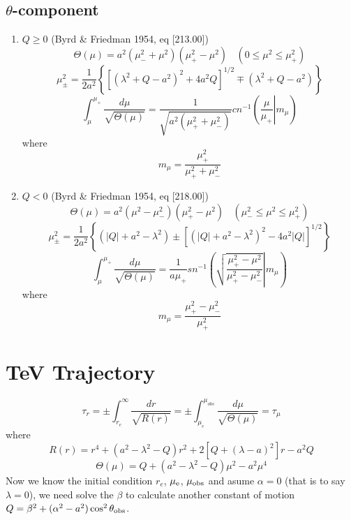 \documentclass[12pt]{book}
\begin{document}
\subsection{$\theta$-component}
\begin{enumerate}
 \item  $Q\geq0$ (Byrd \& Friedman 1954, eq [213.00])
%
\begin{equation}
\Theta(\mu)=a^2(\mu_{-}^2+\mu^2)(\mu_{+}^2-\mu^2)~~~~( 0\leq \mu^2 \leq \mu_+^2)
\end{equation}
%
\begin{equation}
 \mu_{\pm}^2=\frac{1}{2a^2}\left\{\left[\left(\lambda^2+Q-a^2\right)^2+4a^2Q\right]^{1/2}
\mp \left(\lambda^2+Q-a^2\right)\right\}
\end{equation}
%
\begin{equation}
\int_{\mu}^{\mu_{+}}\frac{d\mu}{\sqrt{\Theta(\mu)}}
=\frac{1}{\sqrt{a^2(\mu_{+}^2+\mu_{-}^2)}}cn^{-1}\left(\left.\frac{\mu}{\mu_+}\right|m_\mu\right)
\end{equation}
%
where
\begin{equation}
 m_\mu=\frac{\mu_+^2}{\mu_+^2+\mu_-^2}
\end{equation}
%
\item $Q<0$ (Byrd \& Friedman 1954, eq [218.00])
%
\begin{equation}
\Theta(\mu)=a^2(\mu^2-\mu_{-}^2)(\mu_{+}^2-\mu^2)~~~~( \mu_-^2\leq \mu^2 \leq \mu_+^2)
\end{equation}
%
\begin{equation}
 \mu_{\pm}^2=\frac{1}{2a^2}\left\{\left(|Q|+a^2-\lambda^2\right)
\pm\left[\left(|Q|+a^2-\lambda^2\right)^2-4a^2|Q|\right]^{1/2}\right\}
\end{equation}
%
\begin{equation}
\int_{\mu}^{\mu_+}\frac{d\mu}{\sqrt{\Theta(\mu)}}
=\frac{1}{a\mu_+}sn^{-1}\left(\left.\sqrt{\frac{\mu_+^2-\mu^2}{\mu_+^2-\mu_-^2}}\right|m_\mu\right)
\end{equation}
where
\begin{equation}
 m_\mu=\frac{\mu_+^2-\mu_-^2}{\mu_+^2}
\end{equation}
\end{enumerate}
\section{TeV Trajectory}
\begin{equation}
\tau_r=\pm\int_{r_e}^{\infty}\frac{dr}{\sqrt{R(r)}}=\pm\int_{\mu_e}^{\mu_{obs}}\frac{d\mu}{\sqrt{\Theta(\mu)}}
=\tau_\mu
\end{equation}
where
\begin{equation}
R(r)=r^4+(a^2-\lambda^2-Q)r^2+2[Q+(\lambda-a)^2]r-a^2Q
\end{equation}
\begin{equation}
\Theta(\mu)=Q+(a^2-\lambda^2-Q)\mu^2-a^2\mu^4
\end{equation}
Now we know the initial condition $r_e$, $\mu_{\rm e}$, $\mu_{\rm obs}$ and asume $\alpha=0$ (that is to say $\lambda=0$), we need solve the $\beta$ to calculate another constant of motion $Q=\beta^2+(\alpha^2-a^2)\cos^2\theta_{\rm obs}$.
\end{document}
